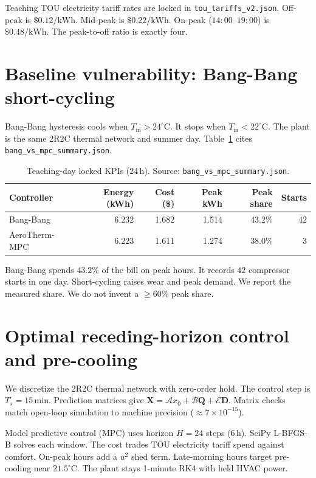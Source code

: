 \documentclass[11pt]{article}
\begin{document}
Teaching TOU electricity tariff rates are locked in
\texttt{tou\_tariffs\_v2.json}.
Off-peak is $\$0.12/\mathrm{kWh}$.
Mid-peak is $\$0.22/\mathrm{kWh}$.
On-peak ($14{:}00$--$19{:}00$) is $\$0.48/\mathrm{kWh}$.
The peak-to-off ratio is exactly four.

\section{Baseline vulnerability: Bang-Bang short-cycling}
Bang-Bang hysteresis cools when $T_{\mathrm{in}}>24^\circ\mathrm{C}$.
It stops when $T_{\mathrm{in}}<22^\circ\mathrm{C}$.
The plant is the same 2R2C thermal network and summer day.
Table~\ref{tab:teach} cites \texttt{bang\_vs\_mpc\_summary.json}.

\begin{table}[htbp]
\centering
\caption{Teaching-day locked KPIs (24\,h). Source: \texttt{bang\_vs\_mpc\_summary.json}.}
\label{tab:teach}
\scriptsize
\begin{tabular}{lrrrrr}
\toprule
Controller & Energy (kWh) & Cost (\$) & Peak kWh & Peak share & Starts \\
\midrule
Bang-Bang & 6.232 & 1.682 & 1.514 & 43.2\% & 42 \\
AeroTherm-MPC & 6.223 & 1.611 & 1.274 & 38.0\% & 3 \\
\bottomrule
\end{tabular}
\end{table}

Bang-Bang spends $43.2\%$ of the bill on peak hours.
It records $42$ compressor starts in one day.
Short-cycling raises wear and peak demand.
We report the measured share.
We do not invent a $\ge 60\%$ peak share.

\section{Optimal receding-horizon control and pre-cooling}
We discretize the 2R2C thermal network with zero-order hold.
The control step is $T_s=15\,\mathrm{min}$.
Prediction matrices give
$\mathbf{X}=\mathcal{A}x_0+\mathcal{B}\mathbf{Q}+\mathcal{E}\mathbf{D}$.
Matrix checks match open-loop simulation to machine precision
($\approx 7\times 10^{-15}$).

Model predictive control (MPC) uses horizon $H=24$ steps ($6\,\mathrm{h}$).
SciPy L-BFGS-B solves each window.
The cost trades TOU electricity tariff spend against comfort.
On-peak hours add a $u^2$ shed term.
Late-morning hours target pre-cooling near $21.5^\circ\mathrm{C}$.
The plant stays 1-minute RK4 with held HVAC power.
\end{document}
